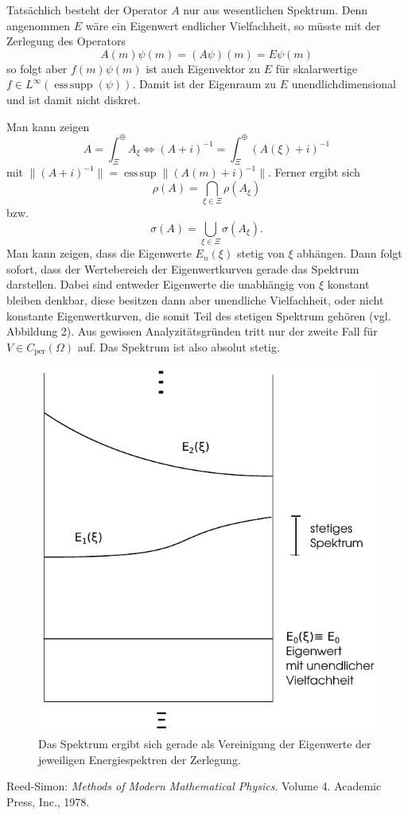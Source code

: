 \documentclass{mywork}
\DeclareMathOperator*{\esssupp}{ess\,supp}
\DeclareMathOperator*{\esssup}{ess\,sup}
\begin{document}
Tatsächlich besteht der Operator $A$ nur aus wesentlichen Spektrum.  Denn angenommen $E$ wäre ein Eigenwert endlicher Vielfachheit, so müsste mit der Zerlegung des Operators
$$
A(m) \psi(m)=(A \psi)(m) = E \psi(m) 
$$
so folgt aber $f(m) \psi(m)$ ist auch Eigenvektor zu $E$ für skalarwertige $f\in L^\infty(\esssupp(\psi))$. Damit ist der Eigenraum zu $E$ unendlichdimensional und ist damit nicht diskret.    

\begin{nt}
Man kann zeigen 
$$A= \int_\Xi^\oplus A_\xi \iff (A+i)^{-1} = \int_\Xi^\oplus (A(\xi)+i)^{-1}$$ mit $\| (A+i)^{-1} \| = \esssup \| (A(m)+i)^{-1}\|$. Ferner ergibt sich 
$$
\rho(A) = \bigcap_{\xi \in \Xi} \rho(A_\xi)
$$
bzw.
$$
\sigma(A) = \bigcup_{\xi \in \Xi} \sigma(A_\xi).
$$
Man kann zeigen, dass die Eigenwerte $E_n(\xi)$ stetig von $\xi$ abhängen.  Dann folgt sofort, dass der Wertebereich der Eigenwertkurven gerade das Spektrum darstellen.  Dabei sind entweder Eigenwerte die unabhängig von $\xi$ konstant bleiben denkbar, diese besitzen dann aber unendliche Vielfachheit, oder nicht konstante Eigenwertkurven, die somit Teil des stetigen Spektrum gehören (vgl. Abbildung 2).  Aus gewissen Analyzitätsgründen tritt nur der zweite Fall für $V\in C_{\text{per}}(\Omega)$ auf. Das Spektrum ist also absolut stetig.
\end{nt}

\begin{figure}[H]
\centering
\includegraphics[width=0.4 \textwidth]{energiespektren.pdf}
\caption{Das Spektrum ergibt sich gerade als Vereinigung der Eigenwerte der jeweiligen Energiespektren der Zerlegung.}
\end{figure}

\begin{thebibliography}{tief}
 Reed-Simon: {\it Methods of Modern Mathematical Physics}. Volume 4. Academic Press, Inc., 1978.
\end{thebibliography} 
\end{document}
